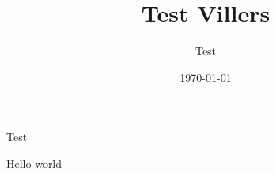 \documentclass[compress,dvipsnames]{beamer}
\title{Test Villers}
\author{Test}
\date{\today}
\begin{document}
\begin{frame}
\titlepage
\end{frame}

\begin{myslide}{Test}

Hello world

\end{myslide}
\end{document}
